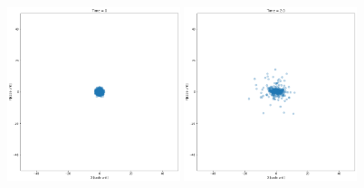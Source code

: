 \documentclass[12pt]{article}
\begin{document}
    \begin{figure}[H]
        \centering 
        \includegraphics[width = 0.45\textwidth]{./RK4/0.png}
        \includegraphics[width = 0.45\textwidth]{./RK4/2.png} 
    \end{figure}
\end{document}
